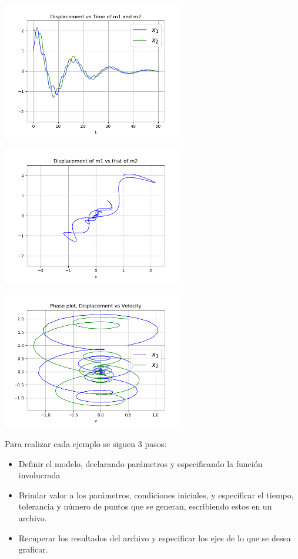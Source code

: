 \documentclass[a4paper]{article}
\begin{document}
\begin{center}
\includegraphics[height=6cm]{ejemplo2-4.png}

\includegraphics[height=6cm]{recta2-4.png}

\includegraphics[height=6cm]{circulo2-4.png}
\end{center}

Para realizar cada ejemplo se siguen 3 pasos:

\begin{itemize}
\item Definir el modelo, declarando parámetros y especificando la función involucrada
\item Brindar valor a los parámetros, condiciones iniciales, y especificar el tiempo, tolerancia y número de puntos que se generan, escribiendo estos en un archivo.
\item Recuperar los resultados del archivo y especificar los ejes de lo que se desea graficar.
\end{itemize}
\end{document}
